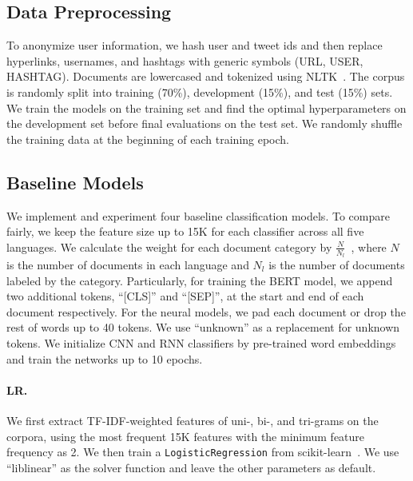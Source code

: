 \subsection{Data Preprocessing}
To anonymize user information, we hash user and tweet ids and then replace hyperlinks, usernames, and hashtags with generic symbols (URL, USER, HASHTAG).
Documents are lowercased and tokenized using NLTK~\cite{bird2004nltk}. 
The corpus is randomly split into training (70\%), development (15\%), and test (15\%) sets. 
We train the models on the training set and find the optimal hyperparameters on the development set before final evaluations on the test set. 
We randomly shuffle the training data at the beginning of each training epoch.



\subsection{Baseline Models}
We implement and experiment four baseline classification models. 
To compare fairly, we keep the feature size up to 15K for each classifier across all five languages.
We calculate the weight for each document category by $\frac{N}{N_l}$~\cite{king2001logistic}, where $N$ is the number of documents in each language and $N_l$ is the number of documents labeled by the category.
Particularly, for training the BERT model, we append two additional tokens, ``[CLS]'' and ``[SEP]'', at the start and end of each document respectively.
For the neural models, we pad each document or drop the rest of words up to 40 tokens.
We use ``unknown'' as a replacement for unknown tokens.
We initialize CNN and RNN classifiers by pre-trained word embeddings~\cite{mikolov2013distributed, godin2015multimedia, bojanowski2017enriching, deriu2017leveraging} and train the networks up to 10 epochs.

\paragraph{LR.} 
We first extract TF-IDF-weighted features of uni-, bi-, and tri-grams on the corpora, using the most frequent 15K features with the minimum feature frequency as 2. 
We then train a \texttt{LogisticRegression} from scikit-learn~\cite{pedregosa2011scikit}. 
We use ``liblinear'' as the solver function and leave the other parameters as default.

